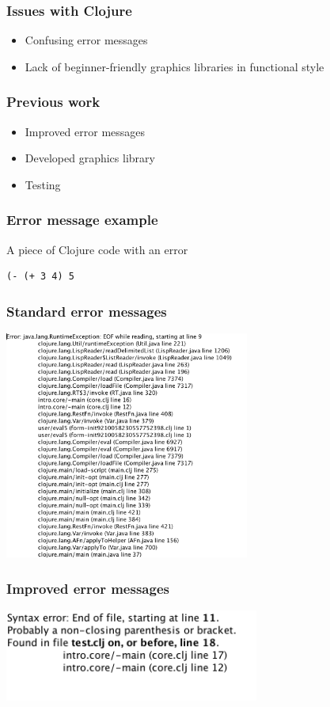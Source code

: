 \documentclass{beamer}
\begin{document}
\begin{frame}
	\frametitle{Issues with Clojure}
	\begin{itemize}
		\item Confusing error messages
		\item Lack of beginner-friendly graphics libraries in functional style
	\end{itemize}
\end{frame}

\begin{frame}
	\frametitle{Previous work}
	\begin{itemize}
		\item Improved error messages
		\item Developed graphics library
		\item Testing
	\end{itemize}
\end{frame}

\begin{frame}[fragile]
\frametitle{Error message example}
A piece of Clojure code with an error
\begin{verbatim}
(- (+ 3 4) 5
\end{verbatim}
\end{frame}

\begin{frame}
	\frametitle{Standard error messages}
	\includegraphics[height=75mm]{standard.png}
\end{frame}

\begin{frame}
	\frametitle{Improved error messages}
	\includegraphics[height=30mm]{improved.png}
\end{frame}
\end{document}
